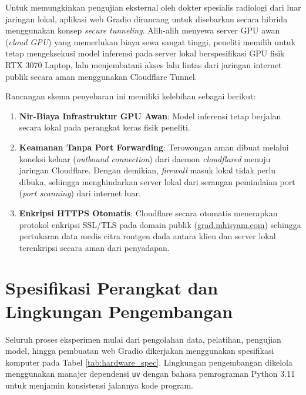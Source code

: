 \documentclass[12pt,a4paper,oneside]{book}
\begin{document}
Untuk memungkinkan pengujian eksternal oleh dokter spesialis radiologi dari luar jaringan lokal, aplikasi web Gradio dirancang untuk disebarkan secara hibrida menggunakan konsep \textit{secure tunneling}. Alih-alih menyewa server GPU awan (\textit{cloud GPU}) yang memerlukan biaya sewa sangat tinggi, peneliti memilih untuk tetap mengeksekusi model inferensi pada server lokal berspesifikasi GPU fisik RTX 3070 Laptop, lalu menjembatani akses lalu lintas dari jaringan internet publik secara aman menggunakan Cloudflare Tunnel.

Rancangan skema penyebaran ini memiliki kelebihan sebagai berikut:
\begin{enumerate}
  \item \textbf{Nir-Biaya Infrastruktur GPU Awan}: Model inferensi tetap berjalan secara lokal pada perangkat keras fisik peneliti.
  \item \textbf{Keamanan Tanpa Port Forwarding}: Terowongan aman dibuat melalui koneksi keluar (\textit{outbound connection}) dari daemon \textit{cloudflared} menuju jaringan Cloudflare. Dengan demikian, \textit{firewall} masuk lokal tidak perlu dibuka, sehingga menghindarkan server lokal dari serangan pemindaian port (\textit{port scanning}) dari internet luar.
  \item \textbf{Enkripsi HTTPS Otomatis}: Cloudflare secara otomatis menerapkan protokol enkripsi SSL/TLS pada domain publik (\url{grad.mhisyam.com}) sehingga pertukaran data medis citra rontgen dada antara klien dan server lokal terenkripsi secara aman dari penyadapan.
\end{enumerate}

\section{Spesifikasi Perangkat dan Lingkungan Pengembangan}

Seluruh proses eksperimen mulai dari pengolahan data, pelatihan, pengujian model, hingga pembuatan web Gradio dikerjakan menggunakan spesifikasi komputer pada Tabel \ref{tab:hardware_spec}. Lingkungan pengembangan dikelola menggunakan manajer dependensi \texttt{uv} dengan bahasa pemrograman Python 3.11 untuk menjamin konsistensi jalannya kode program.
\end{document}
